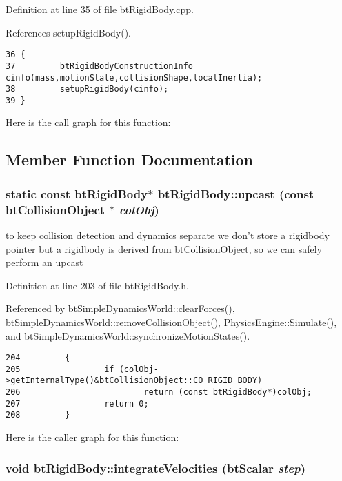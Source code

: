 Definition at line 35 of file btRigidBody.cpp.

References setupRigidBody().

\begin{Code}\begin{verbatim}36 {
37         btRigidBodyConstructionInfo cinfo(mass,motionState,collisionShape,localInertia);
38         setupRigidBody(cinfo);
39 }
\end{verbatim}
\end{Code}




Here is the call graph for this function:

\subsection{Member Function Documentation}
\hypertarget{classbt_rigid_body_59077fce3d2efd193a3fd7d7de2c97e8}{
\subsubsection[upcast]{\setlength{\rightskip}{0pt plus 5cm}static const {\bf btRigidBody}$\ast$ btRigidBody::upcast (const btCollisionObject $\ast$ {\em colObj})}}
\label{classbt_rigid_body_59077fce3d2efd193a3fd7d7de2c97e8}


to keep collision detection and dynamics separate we don't store a rigidbody pointer but a rigidbody is derived from btCollisionObject, so we can safely perform an upcast 

Definition at line 203 of file btRigidBody.h.

Referenced by btSimpleDynamicsWorld::clearForces(), btSimpleDynamicsWorld::removeCollisionObject(), PhysicsEngine::Simulate(), and btSimpleDynamicsWorld::synchronizeMotionStates().

\begin{Code}\begin{verbatim}204         {
205                 if (colObj->getInternalType()&btCollisionObject::CO_RIGID_BODY)
206                         return (const btRigidBody*)colObj;
207                 return 0;
208         }
\end{verbatim}
\end{Code}




Here is the caller graph for this function:\hypertarget{classbt_rigid_body_16029bc5aabcbb33aaf7e6e6e819283a}{
\subsubsection[integrateVelocities]{\setlength{\rightskip}{0pt plus 5cm}void btRigidBody::integrateVelocities (btScalar {\em step})}}
\label{classbt_rigid_body_16029bc5aabcbb33aaf7e6e6e819283a}




